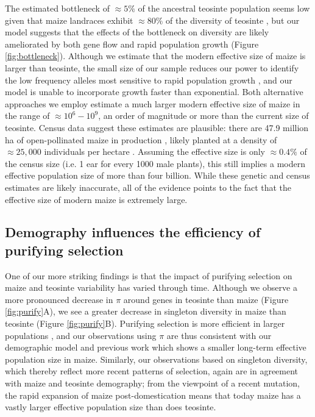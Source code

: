 \documentclass{pnastwo}
\begin{document}
\begin{article}
The estimated bottleneck of $\approx 5\%$ of the ancestral teosinte population seems low given that maize landraces exhibit $\approx 80\%$ of the diversity of teosinte \cite{hufford2012}, but our model suggests that the effects of the bottleneck on diversity are likely ameliorated by both gene flow and rapid population growth (Figure \ref{fig:bottleneck}).   
Although we estimate that the modern effective size of maize is larger than teosinte, the small size of our sample reduces our power to identify the low frequency alleles most sensitive to rapid population growth \cite{keinan2012}, and our model is unable to incorporate growth faster than exponential.  
Both alternative approaches we employ estimate a much larger modern effective size of maize in the range of $\approx 10^6 - 10^9$, an order of magnitude or more than the current size of teosinte.
Census data suggest these estimates are plausible: there are 47.9 million ha of open-pollinated maize in production \cite{cimmyt1999}, likely planted at a density of $\approx 25,000$ individuals per hectare \cite{baden2001culture}.
Assuming the effective size is only $\approx 0.4\%$ of the census size (i.e. 1 ear for every 1000 male plants), this still implies a modern effective population size of more than four billion.
While these genetic and census estimates are likely inaccurate, all of the evidence points to the fact that the effective size of modern maize is extremely large.

\subsection{Demography influences the efficiency of purifying selection}
One of our more striking findings is that the impact of purifying selection on maize and teosinte variability has varied through time. Although we observe a more pronounced decrease in $\pi$ around genes in teosinte than maize (Figure \ref{fig:purify}A), we see a greater decrease in singleton diversity in maize than teosinte (Figure \ref{fig:purify}B). Purifying selection is more efficient in larger populations  \cite{kimura1984}, and our observations using $\pi$  are thus consistent with our demographic model and previous work \cite{eyre1998, tenaillon2004selection, wright2005, ross2009} which shows a smaller long-term effective population size in maize. Similarly, our observations based on singleton diversity, which thereby reflect more recent patterns of selection, again are in agreement with maize and teosinte demography; from the viewpoint of a recent mutation, the rapid expansion of maize post-domestication means that today maize has a vastly larger effective population size than does teosinte.


\end{article}
\end{document}
